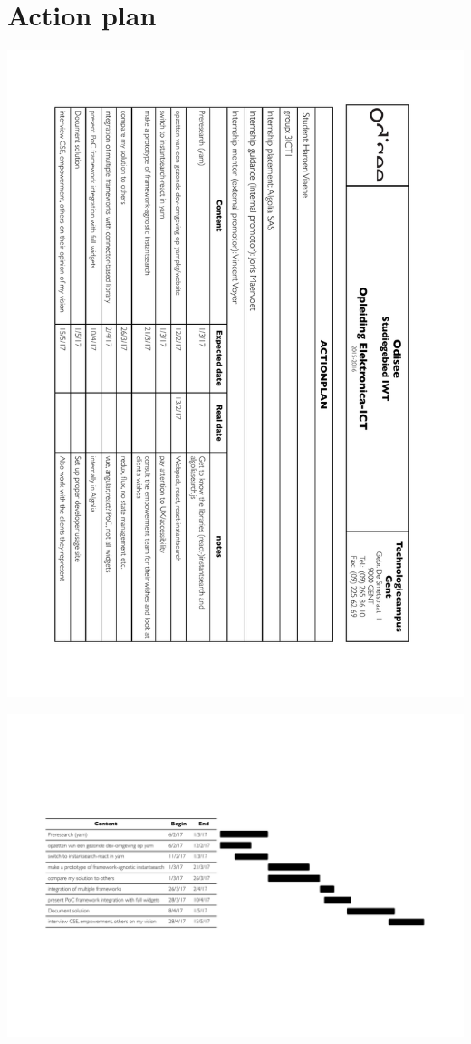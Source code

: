 
\section{Action plan} %
\label{sec:action_plan}

\includegraphics[width=\textwidth, height=0.95\textheight, keepaspectratio]{../assets/action-plan.pdf}

\newpage

\includegraphics[width=\textwidth]{../assets/action-plan-gantt.pdf}
